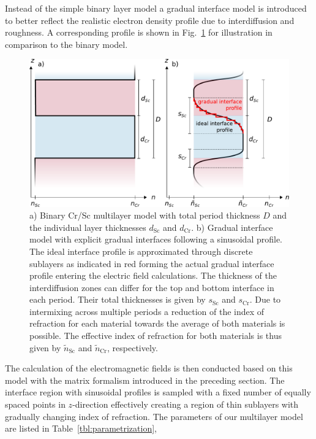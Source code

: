 \documentclass{iucr}              %
\begin{document}
Instead of the simple binary layer model a gradual interface model is introduced to better reflect the realistic electron density profile due to interdiffusion and roughness. A corresponding profile is shown in Fig.~\ref{fig:CrScModel} for illustration in comparison to the binary model.
\begin{figure}
  \centering
  \includegraphics[width=\textwidth]{images/CrSc_model}
  \caption{a) Binary Cr/Sc multilayer model with total period thickness $D$ and the individual layer thicknesses $d_\text{Sc}$ and $d_\text{Cr}$. b) Gradual interface model with explicit gradual interfaces following a sinusoidal profile. The ideal interface profile is approximated through discrete sublayers as indicated in red forming the actual gradual interface profile entering the electric field calculations. The thickness of the interdiffusion zones can differ for the top and bottom interface in each period. Their total thicknesses is given by $s_\text{Sc}$ and $s_\text{Cr}$. Due to intermixing across multiple periods a reduction of the index of refraction for each material towards the average of both materials is possible. The effective index of refraction for both materials is thus given by $\tilde{n}_\text{Sc}$ and $\tilde{n}_\text{Cr}$, respectively.}
  \label{fig:CrScModel}
\end{figure}
The calculation of the electromagnetic fields is then conducted based on this model with the matrix formalism introduced in the preceding section. The interface region with sinusoidal profiles is sampled with a fixed number of equally spaced points in $z$-direction effectively creating a region of thin sublayers with gradually changing index of refraction. The parameters of our multilayer model are listed in Table~\ref{tbl:parametrization},
\end{document}
